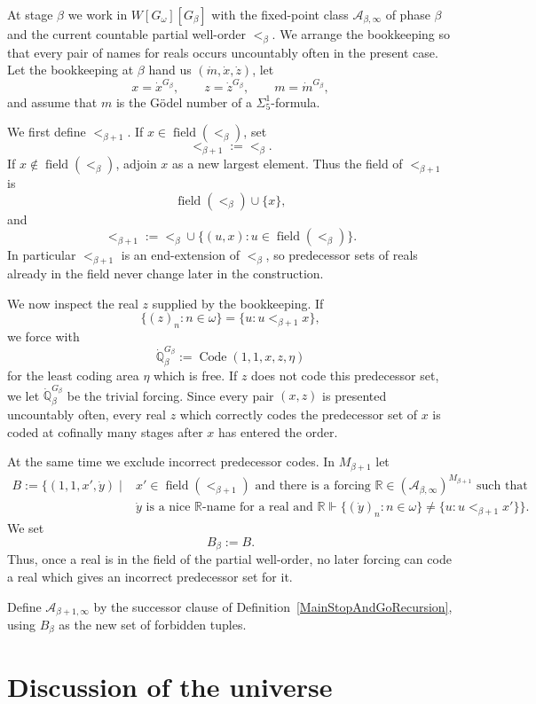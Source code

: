 \documentclass[a4paper,11pt]{article}
\newcommand{\forceQ}{\mathbb{Q}}
\newcommand{\forceR}{\mathbb{R}}
\begin{document}
At stage $\beta$ we work in $W[G_\omega][G_\beta]$ with the fixed-point class $\mathcal A_{\beta,\infty}$ of phase $\beta$ and the current countable partial well-order $<_\beta$. We arrange the bookkeeping so that every pair of names for reals occurs uncountably often in the present case. Let the bookkeeping at $\beta$ hand us $(\dot m,\dot x,\dot z)$, let
\[
x=\dot x^{G_\beta},\qquad z=\dot z^{G_\beta},\qquad m=\dot m^{G_\beta},
\]
and assume that $m$ is the G\"odel number of a $\Sigma^1_5$-formula.

We first define $<_{\beta+1}$. If $x\in\operatorname{field}(<_\beta)$, set
\[
<_{\beta+1}:=<_\beta.
\]
If $x\notin\operatorname{field}(<_\beta)$, adjoin $x$ as a new largest element. Thus the field of $<_{\beta+1}$ is
\[
\operatorname{field}(<_\beta)\cup\{x\},
\]
and
\[
<_{\beta+1}
:=<_\beta\cup
\{(u,x):u\in\operatorname{field}(<_\beta)\}.
\]
In particular $<_{\beta+1}$ is an end-extension of $<_\beta$, so predecessor sets of reals already in the field never change later in the construction.

We now inspect the real $z$ supplied by the bookkeeping. If
\[
\{(z)_n:n\in\omega\}
=
\{u:u<_{\beta+1}x\},
\]
we force with
\[
\dot{\forceQ}_\beta^{G_\beta}
:=\operatorname{Code}(1,1,x,z,\eta)
\]
for the least coding area $\eta$ which is free. If $z$ does not code this predecessor set, we let $\dot{\forceQ}_\beta^{G_\beta}$ be the trivial forcing. Since every pair $(x,z)$ is presented uncountably often, every real $z$ which correctly codes the predecessor set of $x$ is coded at cofinally many stages after $x$ has entered the order.

At the same time we exclude incorrect predecessor codes. In $M_{\beta+1}$ let
\begin{align*}
B:=\{(1,1,x',\dot y)\mid {}&x'\in\operatorname{field}(<_{\beta+1})\text{ and there is a forcing }\forceR\in
(\mathcal A_{\beta,\infty})^{M_{\beta+1}}\text{ such that}\\
&\dot y\text{ is a nice $\forceR$-name for a real and }\forceR\Vdash
\{(\dot y)_n:n\in\omega\}\neq\{u:u<_{\beta+1}x'\}\}.
\end{align*}
We set
\[
B_\beta:=B.
\]
Thus, once a real is in the field of the partial well-order, no later forcing can code a real which gives an incorrect predecessor set for it.

Define $\mathcal A_{\beta+1,\infty}$ by the successor clause of Definition~\ref{MainStopAndGoRecursion}, using $B_\beta$ as the new set of forbidden tuples.
\section{Discussion of the universe}
\end{document}
